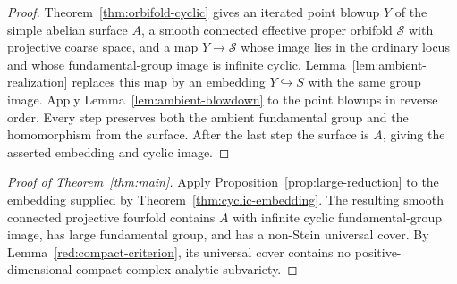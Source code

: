 \documentclass[11pt,reqno]{amsart}
\numberwithin{equation}{section}
\theoremstyle{definition}
\theoremstyle{remark}
\begin{document}
\begin{proof}
Theorem~\ref{thm:orbifold-cyclic} gives an iterated point blowup $Y$ of
the simple abelian surface $A$, a smooth connected effective proper
orbifold $\mathcal S$ with projective coarse space, and a map $Y\to\mathcal S$
whose image lies in the ordinary locus and whose fundamental-group
image is infinite cyclic.  Lemma~\ref{lem:ambient-realization} replaces
this map by an embedding $Y\hookrightarrow S$ with the same group
image.  Apply Lemma~\ref{lem:ambient-blowdown} to the point blowups in
reverse order.  Every step preserves both the ambient fundamental
group and the homomorphism from the surface.  After the last step the
surface is $A$, giving the asserted embedding and cyclic image.
\end{proof}

\begin{samepage}
\begin{proof}[Proof of Theorem~\ref{thm:main}]
Apply Proposition~\ref{prop:large-reduction} to the embedding supplied
by Theorem~\ref{thm:cyclic-embedding}.  The resulting smooth connected
projective fourfold contains $A$ with infinite cyclic fundamental-group
image, has large fundamental group, and has a non-Stein universal cover.  By Lemma~\ref{red:compact-criterion}, its universal
cover contains no positive-dimensional compact complex-analytic
subvariety.
\end{proof}
\end{samepage}



\end{document}
